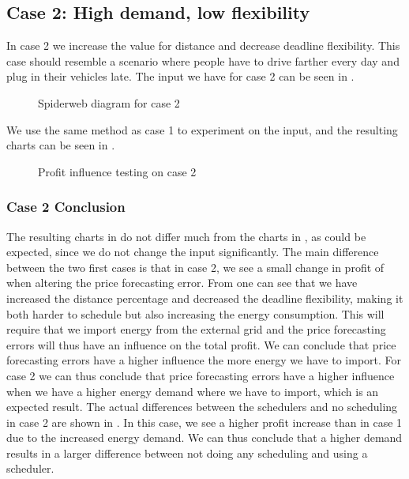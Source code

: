 \FloatBarrier
\subsection{Case 2: High demand, low flexibility}
In case 2 we increase the value for distance and decrease deadline flexibility. This case should resemble a scenario where people have to drive farther every day and plug in their vehicles late. The input we have for case 2 can be seen in . 

\begin{figure}[!htb]
	\centering
	
	\caption{Spiderweb diagram for case 2}\label{fig:case2spiderweb}
\end{figure} 

We use the same method as case 1 to experiment on the input, and the resulting charts can be seen in .

\begin{figure}[!htb]
	\centering
	
	\caption{Profit influence testing on case 2}\label{fig:test_case2}
\end{figure}

\subsubsection{Case 2 Conclusion}
The resulting charts in  do not differ much from the charts in , as could be expected, since we do not change the input significantly. The main difference between the two first cases is that in case 2, we see a small change in profit of  when altering the price forecasting error. From  one can see that we have increased the distance percentage and decreased the deadline flexibility, making it both harder to schedule but also increasing the energy consumption. This will require that we import energy from the external grid and the price forecasting errors will thus have an influence on the total profit. We can conclude that price forecasting errors have a higher influence the more energy we have to import. For case 2 we can thus conclude that price forecasting errors have a higher influence when we have a higher energy demand where we have to import, which is an expected result. The actual differences between the schedulers and no scheduling in case 2 are shown in . In this case, we see a higher profit increase than in case 1 due to the increased energy demand. We can thus conclude that a higher demand results in a larger difference between not doing any scheduling and using a scheduler.  

